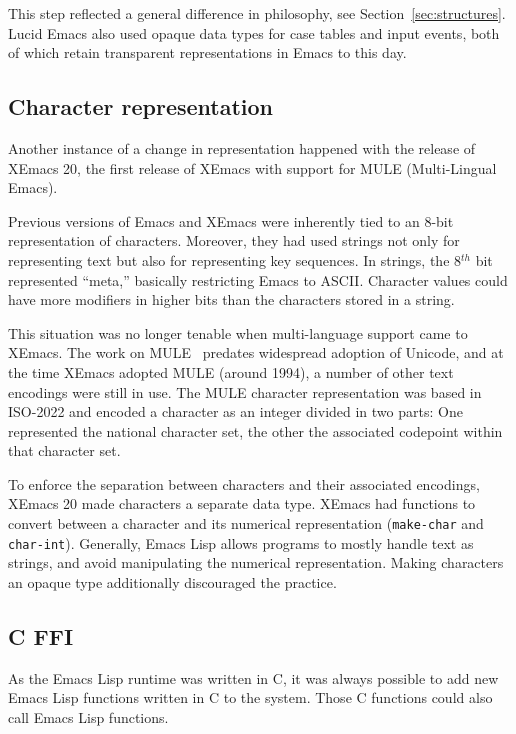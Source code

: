 \documentclass[format=acmsmall, review]{acmart}
\newcommand \Elisp {Emacs Lisp}
\begin{document}
This step reflected a general difference in philosophy, see
Section~\ref{sec:structures}.  Lucid Emacs also used opaque data types
for case tables and input events, both of which retain transparent
representations in Emacs to this day.

\subsection{Character representation}
\label{sec:character-representation}

Another instance of a change in representation happened with the
release of XEmacs 20, the first release of XEmacs with support for
MULE (Multi-Lingual Emacs).

Previous versions of Emacs and XEmacs were inherently tied to an 8-bit
representation of characters.  Moreover, they had used strings not
only for representing text but also for representing key sequences.
In strings, the 8$^{th}$ bit represented ``meta,'' basically restricting
Emacs to ASCII.  Character values could have more
modifiers in higher bits than the characters stored in a string.

This situation was no longer tenable when multi-language support came
to XEmacs.  The work on MULE~\cite{Ohmaki2002} predates widespread
adoption of Unicode, and at the time XEmacs adopted MULE (around
1994), a number of other text encodings were still in use.  The MULE
character representation was based in ISO-2022 and encoded a character as an
integer divided in two parts: One represented the national character set,
the other the associated codepoint within that character set.

To enforce the separation between characters and their associated
encodings, XEmacs 20 made characters a separate data type.  XEmacs had
functions to convert between a character and its numerical
representation (\texttt{make-char} and \texttt{char-int}).  Generally,
\Elisp{} allows programs to mostly handle text as strings,
and avoid manipulating the numerical representation.  Making
characters an opaque type additionally discouraged the practice.

\subsection{C FFI}

As the \Elisp{} runtime was written in C, it was always possible to
add new \Elisp{} functions written in C to the system.  Those C
functions could also call \Elisp{} functions.
\end{document}
